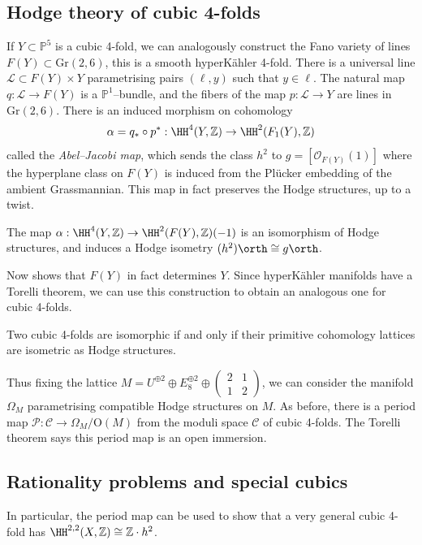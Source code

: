 \subsection{Hodge theory of cubic 4-folds} If \(Y\subset \mathbb{P}^5\) is a
cubic 4-fold, we can analogously construct the Fano variety of lines
\(F(Y)\subset \text{Gr}(2,6)\), this is a smooth hyperK\"ahler 4-fold. There is
a universal line \(\mathscr{L}\subset F(Y)\times Y\) parametrising pairs
\((\ell,y)\) such that \(y\in \ell\). The natural map \(q:\mathscr{L}\to F(Y)\)
is a \(\mathbb{P}^1\)--bundle, and the fibers of the map \(p:\mathscr{L}\to Y\)
are lines in \(\text{Gr}(2,6)\). There is an induced morphism on cohomology
\[
    \alpha=q_\ast\circ p^\ast : \HH^4(Y,\mathbb{Z})\to \HH^2(F_1(Y), \mathbb{Z})
\]
called the \textit{Abel--Jacobi map}, which sends the class \(h^2\) to
\(g=[\mathscr{O}_{F(Y)}(1)]\) where the hyperplane class on \(F(Y)\) is induced
from the Pl\"ucker embedding of the ambient Grassmannian. This map in fact
preserves the Hodge structures, up to a twist.

\begin{theorem}
    The map
    \(\alpha:\HH^4(Y,\mathbb{Z})\to \HH^2(F(Y), \mathbb{Z})(-1)\) is an
    isomorphism of Hodge structures, and induces a Hodge isometry \((h^2)\orth
    \cong g\orth\).
\end{theorem}

Now \cite{charlesRemarkTorelliTheorem} shows that \(F(Y)\) in fact
determines \(Y\). Since hyperK\"ahler manifolds have a Torelli theorem, we can
use this construction to obtain an analogous one for cubic 4-folds.

\begin{corollary}
    Two cubic 4-folds are isomorphic if and only if their primitive
    cohomology lattices are isometric as Hodge structures.
\end{corollary}

Thus fixing the lattice \(M=U^{\oplus 2}\oplus E_8^{\oplus 2}\oplus
\left(\begin{smallmatrix}2&1\\1&2\end{smallmatrix}\right)\), we can consider the
manifold \(\Omega_M\) parametrising compatible Hodge structures on \(M\). As
before, there is a period map \(\mathcal{P}:\mathcal{C}\to \Omega_M/\text{O}(M)\) from the moduli space
\(\mathcal{C}\) of cubic 4-folds. The Torelli theorem says this period map is an
open immersion.

\subsection{Rationality problems and special cubics} In particular, the period
map can be used to show that a very general cubic 4-fold has
\(\HH^{2,2}(X,\mathbb{Z})\cong \mathbb{Z}\cdot h^2\).


